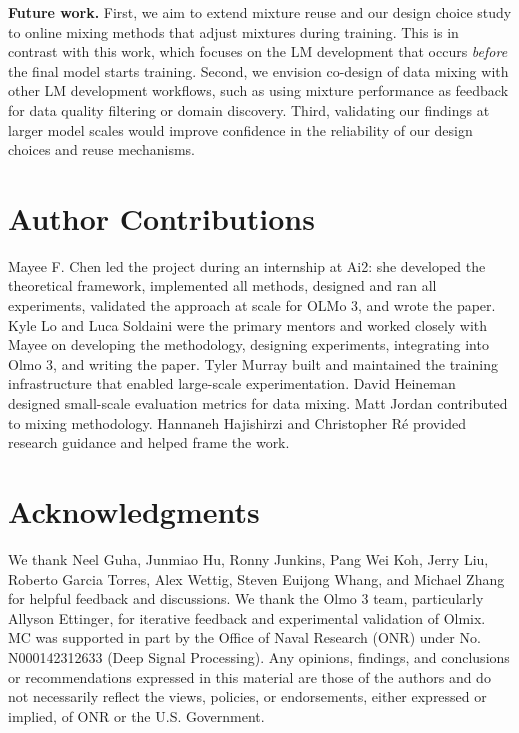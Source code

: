 \documentclass[table]{ai2style/ai2}
\begin{document}
\textbf{Future work.} First, we aim to extend mixture reuse and our design choice study to online mixing methods that adjust mixtures during training. This is in contrast with this work, which focuses on the LM development that occurs \textit{before} the final model starts training. Second, we envision co-design of data mixing with other LM development workflows, such as using mixture performance as feedback for data quality filtering or domain discovery. Third, validating our findings at larger model scales would improve confidence in the reliability of our design choices and reuse mechanisms.

\section*{Author Contributions}

Mayee F. Chen led the project during an internship at Ai2: she developed the theoretical framework, implemented all methods, designed and ran all experiments, validated the approach at scale for OLMo 3, and wrote the paper. Kyle Lo and Luca Soldaini were the primary mentors and worked closely with Mayee on developing the methodology, designing experiments, integrating into Olmo 3, and writing the paper. Tyler Murray built and maintained the training infrastructure that enabled large-scale experimentation. David Heineman designed small-scale evaluation metrics for data mixing. Matt Jordan contributed to mixing methodology. Hannaneh Hajishirzi and Christopher R\'{e} provided research guidance and helped frame the work.

\section*{Acknowledgments}

We thank Neel Guha, Junmiao Hu, Ronny Junkins, Pang Wei Koh, Jerry Liu, Roberto Garcia Torres, Alex Wettig, Steven Euijong Whang, and Michael Zhang for helpful feedback and discussions. 
We thank the Olmo 3 team, particularly Allyson Ettinger, for iterative feedback and experimental validation of Olmix.
MC was supported in part by the Office of Naval Research (ONR) under No. N000142312633 (Deep Signal Processing). Any opinions, findings, and conclusions or recommendations expressed in this material are those of the authors and do not necessarily reflect the views, policies, or endorsements, either expressed or implied, of ONR or the U.S. Government.

\clearpage


\end{document}
